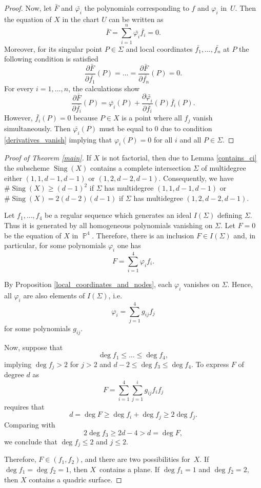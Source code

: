 \documentclass[a4paper,11pt,english,german]{amsart}
\DeclareMathOperator{\IP}{\mathbb{P}}
\DeclareMathOperator{\Sing}{Sing}
\theoremstyle{definition}
\begin{document}
\begin{proof}
Now, let $\bar{F}$ and $\bar{\varphi_i}$ the polynomials corresponding to $f$ and $\varphi_i$ in~$U$. Then the equation of $X$ in the chart $U$ can be written as
	$$\bar{F}=\sum\limits_{i=1}^n \bar{\varphi_i}\bar{f_i}=0.$$
	 Moreover, for its singular point $P\in \Sigma$ and local coordinates $\bar{f_1},\dots,\bar{f_n}$ at $P$ the following condition is satisfied 
	 \begin{equation*}\label{derivatives_vanish}
	 	\dfrac{\partial \bar{F}}{\partial \bar{f_1}}(P)=\dots=\dfrac{\partial \bar{F}}{\partial \bar{f_n}}(P)=0.\tag{5.5}
	 \end{equation*}
	 For every $i=1,\dots,n$, the calculations show
	 \begin{equation*}
	 	\dfrac{\partial \bar{F}}{\partial \bar{f_i}}(P)=\bar{\varphi_i}(P)+\dfrac{\partial \bar{\varphi_i}}{\partial \bar{f_i}}(P) \bar{f_i}(P).
	 \end{equation*}
	However, $\bar{f_i}(P)=0$ because $P\in X$ is a point where all $f_j$ vanish simultaneously. Then $\bar{\varphi_i}(P)$ must be equal to $0$ due to condition \eqref{derivatives_vanish} implying that $\varphi_i(P)=0$  for all $i$ and all $P\in \Sigma$. 
\end{proof}


\begin{proof}[Proof of Theorem \ref{main}]
	If $X$ is not factorial, then due to Lemma \ref{contains_ci} the subscheme $\Sing(X)$ contains a complete intersection $\Sigma$ of multidegree either $(1,1,d-1,d-1)$ or $(1,2,d-2,d-1)$. Consequently, we have $\#\Sing(X)\geqslant (d-1)^2$ if $\Sigma$ has multidegree $(1,1,d-1,d-1)$ or $\#\Sing(X)=2(d-2)(d-1)$ if $\Sigma$ has multidegree $(1,2,d-2,d-1)$.
	
	Let $f_1,\dots,f_4$ be a regular sequence which generates an ideal $I(\Sigma)$ defining $\Sigma$. Thus it is generated by all homogeneous polynomials vanishing on $\Sigma$. Let $F=0$ be the equation of $X$ in $\IP^4$. Therefore, there is an inclusion $F\in I(\Sigma)$ and, in particular, for some polynomials $\varphi_i$ one has 
	$$F=\sum\limits_{i=1}^4 \varphi_i f_i.$$
	
	By Proposition \ref{local_coordinates_and_nodes}, each $\varphi_i$ vanishes on $\Sigma$. Hence, all $\varphi_i$ are also elements of $I(\Sigma)$, i.e. 
	$$\varphi_i=\sum\limits_{j=1}^4 g_{ij} f_j$$
	for some polynomials $g_{ij}$.

	Now, suppose that $$\deg f_1 \leqslant \dots \leqslant \deg f_4,$$
	implying $\deg f_j >2$ for $j>2$ and $d-2 \leqslant \deg f_3 \leqslant \deg f_4$. To express $F$ of degree $d$ as 
	$$F=\sum\limits_{i=1}^4\sum\limits_{j=1}^i g_{ij}f_i f_j$$
	requires that	
	$$d=\deg F\geqslant \deg f_i +\deg f_j \geqslant 2 \deg f_j.$$
	Comparing with 
	$$2\deg f_3\geqslant 2d-4 >d=\deg F,$$
	 we conclude that $\deg f_j \leqslant 2$ and $j\leqslant 2$. 
	 
	 Therefore, $F\in (f_1,f_2)$, and there are two possibilities for~$X$. If~$ \deg f_1=\deg f_2 =1$, then $X$~contains a plane. If $\deg f_1=1$ and $\deg f_2=2$, then $X$ contains a quadric surface.
\end{proof}
\end{document}

